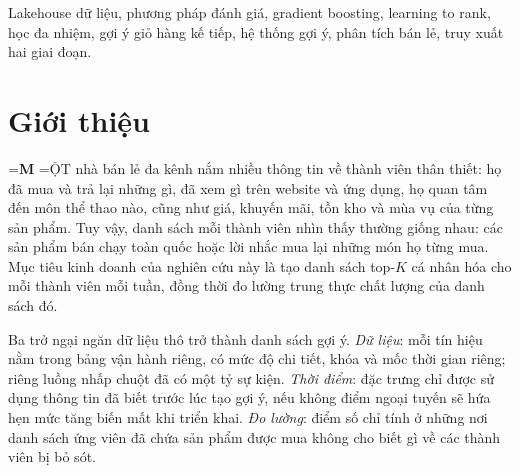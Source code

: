 \documentclass[jtehm]{ieeeaccess}
\begin{document}
\begin{keywords}
Lakehouse dữ liệu, phương pháp đánh giá, gradient boosting, learning to rank, học đa nhiệm, gợi ý giỏ hàng kế tiếp, hệ thống gợi ý,
phân tích bán lẻ, truy xuất hai giai đoạn.
\end{keywords}

\titlepgskip=-15pt

\makeatletter
\def\maketitle{\twocolumn[\thispagestyle{titlepage}\@maketitle
\vskip 0.3\baselineskip plus 0.1\baselineskip minus 0.1\baselineskip
\vspace*{-1pt}\vspace*{-24pt}]}
\def\PARstart#1#2{\par\noindent\setbox0=\hbox{\bfseries\fontsize{26}{26}\selectfont\MakeUppercase{#1}\hspace{0.15em}}%
\hangindent=\wd0\hangafter=-2\makebox[0pt][l]{\hspace{-\wd0}\raisebox{-1.05\baselineskip}[0pt][0pt]{\box0}}\MakeUppercase{#2}}
\makeatother

\maketitle

\section{Giới thiệu}
\label{sec:introduction}

\PARstart{M}{ột} nhà bán lẻ đa kênh nắm nhiều thông tin về thành viên thân thiết: họ đã mua và trả lại những gì, đã xem gì trên website và ứng dụng, họ quan tâm đến môn thể thao nào, cũng như giá, khuyến mãi, tồn kho và mùa vụ của từng sản phẩm. Tuy vậy, danh sách mỗi thành viên nhìn thấy thường giống nhau: các sản phẩm bán chạy toàn quốc hoặc lời nhắc mua lại những món họ từng mua. Mục tiêu kinh doanh của nghiên cứu này là tạo danh sách top-$K$ cá nhân hóa cho mỗi thành viên mỗi tuần, đồng thời đo lường trung thực chất lượng của danh sách đó.

Ba trở ngại ngăn dữ liệu thô trở thành danh sách gợi ý. \emph{Dữ liệu}: mỗi tín hiệu nằm trong bảng vận hành riêng, có mức độ chi tiết, khóa và mốc thời gian riêng; riêng luồng nhấp chuột đã có một tỷ sự kiện. \emph{Thời điểm}: đặc trưng chỉ được sử dụng thông tin đã biết trước lúc tạo gợi ý, nếu không điểm ngoại tuyến sẽ hứa hẹn mức tăng biến mất khi triển khai. \emph{Đo lường}: điểm số chỉ tính ở những nơi danh sách ứng viên đã chứa sản phẩm được mua không cho biết gì về các thành viên bị bỏ sót.
\end{document}
